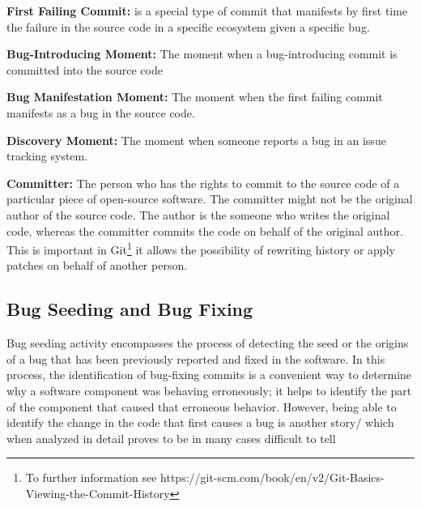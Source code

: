 \documentclass[a4paper, 12pt]{book}
\begin{document}
\textbf{First Failing Commit:} is a special type of commit that manifests by first time the failure in the source code in a specific ecosystem given a specific bug. %

\textbf{Bug-Introducing Moment:} The moment when a bug-introducing commit is committed into the source code

\textbf{Bug Manifestation Moment:} The moment when the first failing commit manifests as a bug in the source code. 

\textbf{Discovery Moment:} The moment when someone reports a bug in an issue tracking system. 

\textbf{Committer:} The person who has the rights to commit to the source code of a particular piece of open-source software. The committer might not be the original author of the source code. The author is the someone who writes the original code, whereas the committer commits the code on behalf of the original author. This is important in Git\footnote{To further information see https://git-scm.com/book/en/v2/Git-Basics-Viewing-the-Commit-History} it allows the possibility of rewriting history or apply patches on behalf of another person. 

\subsection{Bug Seeding and Bug Fixing}
\label{subsec:bugseeding}

Bug seeding activity encompasses the process of detecting the seed or the origins of a bug that has been previously reported and fixed in the software. In this process, the identification of bug-fixing commits is a convenient way to determine why a software component was behaving erroneously; it helps to identify the part of the component that caused that erroneous behavior. However, being able to identify the change in the code that first causes a bug is another story/ which when analyzed in detail proves to be in many cases difficult to tell
\end{document}
